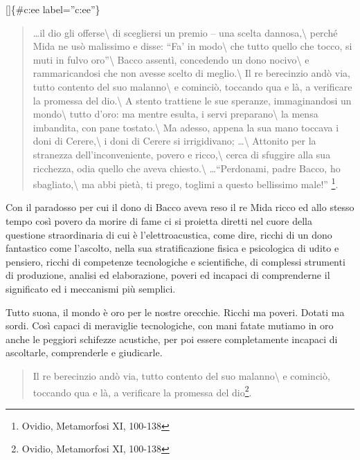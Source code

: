 \documentclass[a4paper,11pt]{article}
\begin{document}
{[}{]}\{\#c:ee label=''c:ee''\}

\begin{quote}
\ldots{}il dio gli offerse\textbackslash{}
di scegliersi un premio -- una scelta dannosa,\textbackslash{}
perché Mida ne usò malissimo e disse: ``Fa' in modo\textbackslash{}
che tutto quello che tocco, si muti in fulvo oro''\textbackslash{}
Bacco assentì, concedendo un dono nocivo\textbackslash{}
e rammaricandosi che non avesse scelto di meglio.\textbackslash{}
Il re berecinzio andò via, tutto contento del suo malanno\textbackslash{}
e cominciò, toccando qua e là, a verificare la promessa del dio.\textbackslash{}
A stento trattiene le sue speranze, immaginandosi un mondo\textbackslash{}
tutto d'oro: ma mentre esulta, i servi preparano\textbackslash{}
la mensa imbandita, con pane tostato.\textbackslash{}
Ma adesso, appena la sua mano toccava i doni di Cerere,\textbackslash{}
i doni di Cerere si irrigidivano; \ldots{}\textbackslash{}
Attonito per la stranezza dell'inconveniente, povero e ricco,\textbackslash{}
cerca di sfuggire alla sua ricchezza, odia quello che aveva chiesto.\textbackslash{}
\ldots{}``Perdonami, padre Bacco, ho sbagliato,\textbackslash{}
ma abbi pietà, ti prego, toglimi a questo bellissimo male!'' \footnote{Ovidio, Metamorfosi XI, 100-138}.
\end{quote}

Con il paradosso per cui il dono di Bacco aveva reso il re Mida ricco ed
allo stesso tempo così povero da morire di fame ci si proietta diretti
nel cuore della questione straordinaria di cui è l'elettroacustica, come
dire, ricchi di un dono fantastico come l'ascolto, nella sua
stratificazione fisica e psicologica di udito e pensiero, ricchi di
competenze tecnologiche e scientifiche, di complessi strumenti di
produzione, analisi ed elaborazione, poveri ed incapaci di comprenderne
il significato ed i meccanismi più semplici.

Tutto suona, il mondo è oro per le nostre orecchie. Ricchi ma poveri.
Dotati ma sordi. Così capaci di meraviglie tecnologiche, con mani fatate
mutiamo in oro anche le peggiori schifezze acustiche, per poi essere
completamente incapaci di ascoltarle, comprenderle e giudicarle.

\begin{quote}
Il re berecinzio andò via, tutto contento del suo malanno\textbackslash{}
e cominciò, toccando qua e là, a verificare la promessa del dio\footnote{Ovidio, Metamorfosi XI, 100-138}.
\end{quote}
\end{document}
